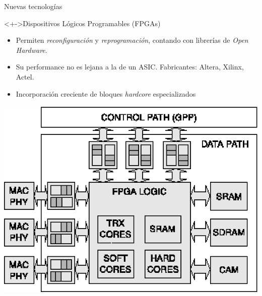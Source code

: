 \documentclass[xcolor=dvipsnames]{beamer}
\begin{document}
\begin{frame}{Nuevas tecnologías}

  \begin{block}<+->{Dispositivos Lógicos Programables (FPGAs)} 
    \begin{itemize}
      \scriptsize
      \item Permiten \emph{reconfiguración} y \emph{reprogramación}, contando con librerías de \emph{Open Hardware}. 
      \item Su performance no es lejana a la de un ASIC. Fabricantes: Altera, Xilinx, Actel.
      \item Incorporación creciente de bloques \emph{hardcore} especializados
    \end{itemize}
    \center
    \includegraphics[scale=0.38]{figures/FPGA_based.eps}      
  \end{block}  
\end{frame}
\end{document}
